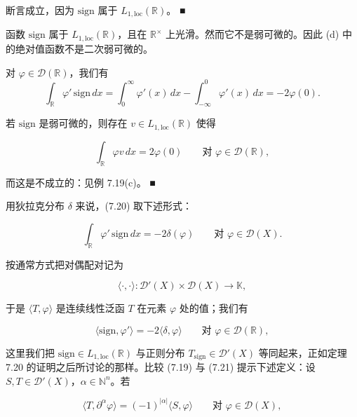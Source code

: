 \begin{remark}
\begin{items}
断言成立，因为 $ \mathrm{sign} $ 属于 $ L_{1,\mathrm{loc}}(\mathbb{R}) $。 \nobreak\hspace{0.35em}■

\item

函数 $ \mathrm{sign} $ 属于 $ L_{1,\mathrm{loc}}(\mathbb{R}) $，且在 $ \mathbb{R}^{\times} $ 上光滑。然而它不是弱可微的。因此 (d) 中的绝对值函数不是二次弱可微的。

\proofhead
对 $ \varphi \in \mathcal{D}(\mathbb{R}) $，我们有
\begin{equation}
\int_{\mathbb{R}} \varphi'\,\mathrm{sign}\, dx = \int_0^{\infty} \varphi'(x)\, dx - \int_{-\infty}^0 \varphi'(x)\, dx = -2\varphi(0) .\tag{7.20}
\end{equation}

若 $ \mathrm{sign} $ 是弱可微的，则存在 $ v \in L_{1,\mathrm{loc}}(\mathbb{R}) $ 使得

\[
\int_{\mathbb{R}} \varphi v\, dx = 2\varphi(0) \qquad \text{对 } \varphi \in \mathcal{D}(\mathbb{R}) ,
\]

而这是不成立的：见例 7.19(c)。 \nobreak\hspace{0.35em}■

\end{items}

用狄拉克分布 $ \delta $ 来说，(7.20) 取下述形式：

\[
\int_{\mathbb{R}} \varphi'\,\mathrm{sign}\, dx = -2\delta(\varphi) \qquad \text{对 } \varphi \in \mathcal{D}(X) .
\]

按通常方式把对偶配对记为

\[
\langle \cdot , \cdot \rangle : \mathcal{D}'(X) \times \mathcal{D}(X) \to \mathbb{K} ,
\]

于是 $ \langle T, \varphi \rangle $ 是连续线性泛函 $ T $ 在元素 $ \varphi $ 处的值；我们有

\begin{equation}
\langle \mathrm{sign}, \varphi' \rangle = -2\langle \delta, \varphi \rangle \qquad \text{对 } \varphi \in \mathcal{D}(\mathbb{R}) ,\tag{7.21}
\end{equation}

这里我们把 $ \mathrm{sign} \in L_{1,\mathrm{loc}}(\mathbb{R}) $ 与正则分布 $ T_{\mathrm{sign}} \in \mathcal{D}'(X) $ 等同起来，正如定理 7.20 的证明之后所讨论的那样。比较 (7.19) 与 (7.21) 提示下述定义：设 $ S, T \in \mathcal{D}'(X) $，$ \alpha \in \mathbb{N}^n $。若

\[
\langle T, \partial^{\alpha}\varphi \rangle = (-1)^{|\alpha|}\langle S, \varphi \rangle \qquad \text{对 } \varphi \in \mathcal{D}(X) ,
\]


\end{remark}
